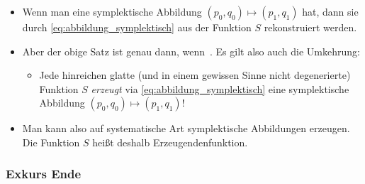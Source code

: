 \begin{itemize}
	\item Wenn man eine symplektische Abbildung $(p_0,q_0)\mapsto(p_1,q_1)$ hat, dann sie durch \eqref{eq:abbildung_symplektisch} aus der Funktion $S$ rekonstruiert werden.
	\item Aber der obige Satz ist \glqq genau dann, wenn\grqq\ . Es gilt also auch die Umkehrung:
	\begin{itemize}
		\item Jede hinreichen glatte (und in einem gewissen Sinne nicht degenerierte)
		 Funktion $S$ \emph{erzeugt} via \eqref{eq:abbildung_symplektisch} eine symplektische Abbildung $(p_0,q_0)\mapsto (p_1,q_1)$!
	\end{itemize}
	\item Man kann also auf systematische Art symplektische Abbildungen erzeugen. Die Funktion $S$ heißt deshalb Erzeugendenfunktion.
\end{itemize}


\subsubsection*{Exkurs Ende}

